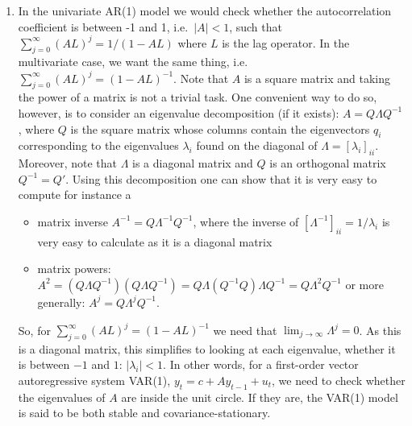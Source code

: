\begin{enumerate}

\item

In the univariate AR{(1)} model we would check whether the autocorrelation coefficient is between -1 and 1, i.e.\ 
  \(|A|<1\), such that \(\sum_{j=0}^\infty {(AL)}^j=1/(1-AL)\) where \(L\) is the lag operator.
In the multivariate case, we want the same thing, i.e.\
  \(\sum_{j=0}^\infty {(AL)}^j = {(1-AL)}^{-1}\).
Note that \(A\) is a square matrix and taking the power of a matrix is not a trivial task.
One convenient way to do so, however, is to consider an eigenvalue decomposition (if it exists):
\(A= Q \Lambda Q^{-1}\), where \(Q\) is the square matrix
  whose columns contain the eigenvectors \(q_i\)
  corresponding to the eigenvalues \(\lambda_i\)
  found on the diagonal of \(\Lambda = {[\lambda_i]}_{ii}\).
Moreover, note that \(\Lambda \) is a diagonal matrix
  and \(Q\) is an orthogonal matrix \(Q^{-1}=Q'\).
Using this decomposition one can show that it is very easy to compute for instance a
\begin{itemize}
  \item matrix inverse \(A^{-1} = Q \Lambda^{-1} Q^{-1}\),
  where the inverse of \({[\Lambda^{-1}]}_{ii} = 1/\lambda_i\) is very easy to calculate as it is a diagonal matrix
  \item matrix powers: \(A^2=(Q\Lambda Q^{-1})(Q\Lambda Q^{-1})=Q\Lambda (Q^{-1}Q) \Lambda Q^{-1} = Q \Lambda^2 Q^{-1}\)
  or more generally: \(A^j = Q \Lambda^j Q^{-1}\).
\end{itemize}
So, for \(\sum_{j=0}^\infty {(AL)}^j = {(1-AL)}^{-1}\) we need that \(\lim_{j\rightarrow \infty}\Lambda^j=0\).
As this is a diagonal matrix, this simplifies to looking at each eigenvalue,
  whether it is between \(-1\) and \(1\): \(|\lambda_i|<1\).
In other words, for a first-order vector autoregressive system VAR{(1)}, \(y_t = c + A y_{t-1} + u_t\),
  we need to check whether the eigenvalues of \(A\) are inside the unit circle.
If they are, the VAR{(1)} model is said to be both stable and covariance-stationary.


\end{enumerate}
